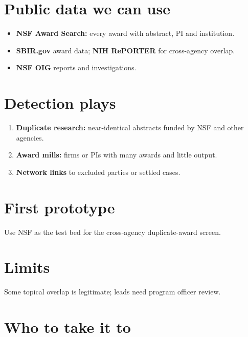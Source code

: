 \documentclass[letterpaper,11pt]{article}
\providecommand{\tightlist}{\setlength{\itemsep}{0pt}\setlength{\parskip}{0pt}}
\begin{document}
\hypertarget{public-data-we-can-use}{%
\section{Public data we can use}\label{public-data-we-can-use}}

\begin{itemize}
\tightlist
\item
  \textbf{NSF Award Search:} every award with abstract, PI and
  institution.
\item
  \textbf{SBIR.gov} award data; \textbf{NIH RePORTER} for cross-agency
  overlap.
\item
  \textbf{NSF OIG} reports and investigations.
\end{itemize}

\hypertarget{detection-plays}{%
\section{Detection plays}\label{detection-plays}}

\begin{enumerate}
\def\labelenumi{\arabic{enumi}.}
\tightlist
\item
  \textbf{Duplicate research:} near-identical abstracts funded by NSF
  and other agencies.
\item
  \textbf{Award mills:} firms or PIs with many awards and little output.
\item
  \textbf{Network links} to excluded parties or settled cases.
\end{enumerate}

\hypertarget{first-prototype}{%
\section{First prototype}\label{first-prototype}}

Use NSF as the test bed for the cross-agency duplicate-award screen.

\hypertarget{limits}{%
\section{Limits}\label{limits}}

Some topical overlap is legitimate; leads need program officer review.

\hypertarget{who-to-take-it-to}{%
\section{Who to take it to}\label{who-to-take-it-to}}
\end{document}
